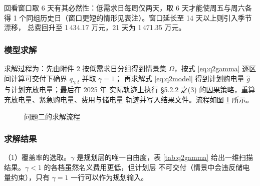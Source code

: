 \documentclass[withoutpreface]{cumcmthesis}
\begin{document}
回看窗口取 6 天有其必然性：低需求日每周仅两天，取 6 天才能使周五与周六各得
1 个同组历史日（窗口更短的情形见表注）。窗口延长至 14 天以上则引入季节漂移，
总费回升至 1\,434.17 万元，21 天为 1\,471.35 万元。

\subsubsection{模型求解}

求解过程为：先由附件 2 按低需求日分组得到情景集 $\Omega$，按式
\eqref{eq:q2gamma} 逐区间计算可交付下确界 $q_{\gamma,t}$ 并取 $\gamma=1$；
再求解式 \eqref{eq:q2model} 得到计划购电量 $\hat g$ 与计划充放电量；最后在 2025 年
实际轨迹上执行 \S5.2.2 之(3) 的因果策略，重算充放电量、紧急购电量、费用与储电量
轨迹并写入结果文件。流程如图 \ref{fig:q2flow} 所示。

\begin{figure}[!htbp]
  \centering
  \caption{问题二的求解流程}
  \label{fig:q2flow}
\end{figure}

\subsubsection{求解结果}

\noindent（1）覆盖率的选取。$\gamma$ 是规划层的唯一自由度，表
\ref{tab:q2gamma} 给出一维扫描结果。$\gamma<1$ 的各档虽然名义费用更低，但计划层
不可交付（情景中会违反储电量约束），只有 $\gamma=1$ 一行可以作为规划输入。
\end{document}
